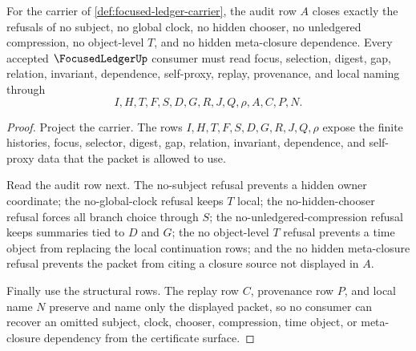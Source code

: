 \begin{theorem}
\label{thm:focused-ledger-audit-closure}
For the carrier of \autoref{def:focused-ledger-carrier}, the audit row $A$ closes exactly the refusals of no subject, no global clock, no hidden chooser, no unledgered compression, no object-level $T$, and no hidden meta-closure dependence. Every accepted $\FocusedLedgerUp$ consumer must read focus, selection, digest, gap, relation, invariant, dependence, self-proxy, replay, provenance, and local naming through
$$
I,H,T,F,S,D,G,R,J,Q,\rho,A,C,P,N.
$$
\end{theorem}
\begin{proof}
Project the carrier. The rows $I,H,T,F,S,D,G,R,J,Q,\rho$ expose the finite histories, focus, selector, digest, gap, relation, invariant, dependence, and self-proxy data that the packet is allowed to use.

Read the audit row next. The no-subject refusal prevents a hidden owner coordinate; the no-global-clock refusal keeps $T$ local; the no-hidden-chooser refusal forces all branch choice through $S$; the no-unledgered-compression refusal keeps summaries tied to $D$ and $G$; the no object-level $T$ refusal prevents a time object from replacing the local continuation rows; and the no hidden meta-closure refusal prevents the packet from citing a closure source not displayed in $A$.

Finally use the structural rows. The replay row $C$, provenance row $P$, and local name $N$ preserve and name only the displayed packet, so no consumer can recover an omitted subject, clock, chooser, compression, time object, or meta-closure dependency from the certificate surface.
\end{proof}

